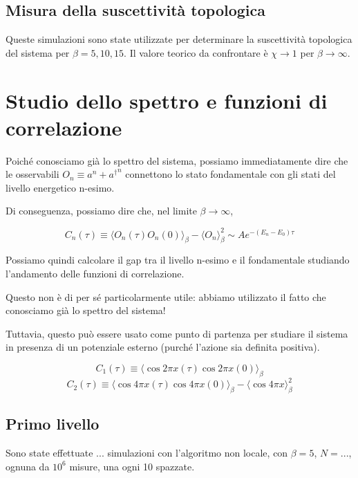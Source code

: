 \documentclass[a4paper,11pt]{article}
\newcommand{\avg}[1]{\langle {#1} \rangle}
\begin{document}
    \subsection{Misura della suscettività topologica}
    
    Queste simulazioni sono state utilizzate per determinare la suscettività topologica del sistema per $\beta = 5, 10, 15$. Il valore teorico da confrontare è $\chi \to 1$ per $\beta \to \infty$.
    
    \section{Studio dello spettro e funzioni di correlazione}
    
    Poiché conosciamo già lo spettro del sistema, possiamo immediatamente dire che le osservabili $O_n \equiv a^n + {a^\dagger}^n$ connettono lo stato fondamentale con gli stati del livello energetico n-esimo.
    
    Di conseguenza, possiamo dire che, nel limite $\beta \to \infty$, 
    
    \begin{equation}
        C_n (\tau) \equiv \avg{ O_n(\tau)O_n(0) }_\beta - \avg{O_n}^2_\beta \sim A e^{-(E_n - E_0) \tau}
    \end{equation}
    
    Possiamo quindi calcolare il gap tra il livello n-esimo e il fondamentale studiando l'andamento delle funzioni di correlazione. 
    
    Questo non è di per sé particolarmente utile: abbiamo utilizzato il fatto che conosciamo già lo spettro del sistema! 
    
    Tuttavia, questo può essere usato come punto di partenza per studiare il sistema in presenza di un potenziale esterno (purché l'azione sia definita positiva). 

    
    \begin{equation}
         C_1 (\tau) \equiv \avg{\cos 2\pi x(\tau) \cos 2\pi x(0)}_\beta 
    \end{equation}
    \begin{equation}
        C_2 (\tau) \equiv \avg{\cos 4\pi x(\tau) \cos 4\pi x(0)}_\beta - \avg{\cos 4\pi x}^2_\beta
    \end{equation}
    
    \subsection{Primo livello}

    Sono state effettuate ... simulazioni con l'algoritmo non locale, con $\beta = 5$, $N = ...$, ognuna da $10^6$ misure, una ogni 10 spazzate.

    

    
\end{document}
